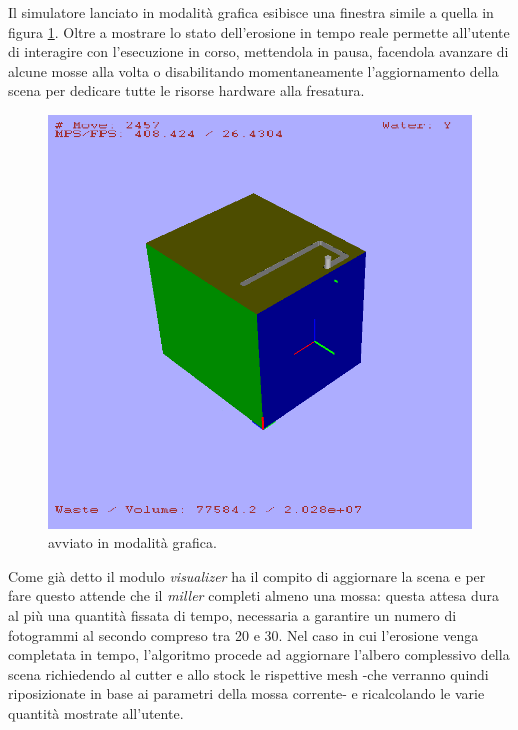 Il simulatore lanciato in modalità grafica esibisce una finestra simile a quella in figura \ref{fig:visualizer_graphicmode}. Oltre a mostrare lo stato dell'erosione in tempo reale permette all'utente di interagire con l'esecuzione in corso, mettendola in pausa, facendola avanzare di alcune mosse alla volta o disabilitando momentaneamente l'aggiornamento della scena per dedicare tutte le risorse hardware alla fresatura.
\begin{figure}[htp]
	\centering
	\includegraphics[width=.85\textwidth]{img/visualizer_graphicmode}
	\caption{ avviato in modalità grafica.}
	\label{fig:visualizer_graphicmode}
\end{figure}

Come già detto il modulo \emph{visualizer} ha il compito di aggiornare la scena e per fare questo attende che il \emph{miller} completi almeno una mossa: questa attesa dura al più una quantità fissata di tempo, necessaria a garantire un numero di fotogrammi al secondo compreso tra 20 e 30. Nel caso in cui l'erosione venga completata in tempo, l'algoritmo procede ad aggiornare l'albero complessivo della scena richiedendo al cutter e allo stock le rispettive mesh -che verranno quindi riposizionate in base ai parametri della mossa corrente- e ricalcolando le varie quantità mostrate all'utente.
